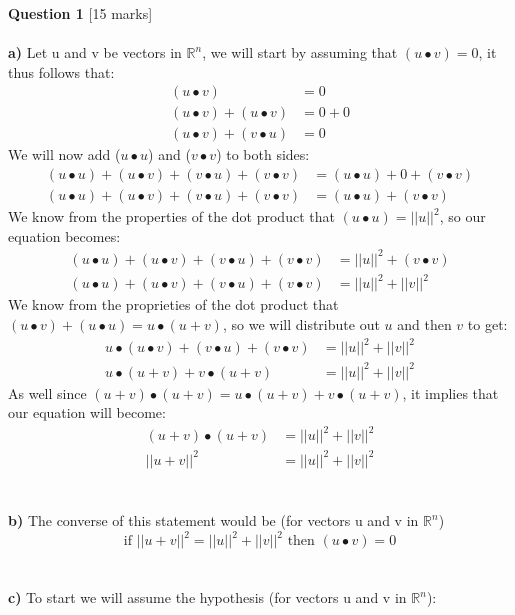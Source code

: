 \documentclass[11pt]{article}
\begin{document}
\textbf{Question 1} [15 marks] \\\\
\textbf{a)} Let u and v be vectors in $\mathbb{R}^n$, we will start by assuming that $(u \bullet v) = 0$, it thus follows that:
\begin{align*}
(u \bullet v)  &= 0 \\
(u \bullet v)  + (u \bullet v) &= 0 + 0\\
(u \bullet v) + (v \bullet u) &= 0
\end{align*}
We will now add ($u \bullet u$) and ($v \bullet v$) to both sides:
\begin{align*}
(u \bullet u) + (u \bullet v)  + (v \bullet u) + (v \bullet v)  &=(u \bullet u) + 0 + (v \bullet v)\\
(u \bullet u) + (u \bullet v)  + (v \bullet u) + (v \bullet v)  &=(u \bullet u) + (v \bullet v)
\end{align*}
We know from the properties of the dot product that $(u\bullet u) = ||u||^2$, so our equation becomes:
\begin{align*}
(u \bullet u) + (u \bullet v)  + (v \bullet u) + (v \bullet v)  &=||u||^2 + (v \bullet v)\\
(u \bullet u) + (u \bullet v)  + (v \bullet u) + (v \bullet v)  &=||u||^2 + ||v||^2
\end{align*}
We know from the proprieties of the dot product that $(u \bullet v) + (u \bullet u) = u \bullet (u+ v)$, so we will distribute out $u$ and then $v$ to get:
\begin{align*}
u \bullet (u \bullet v)  + (v \bullet u) + (v \bullet v)  &=||u||^2 + ||v||^2\\
u \bullet (u + v) +  v \bullet (u + v) &=||u||^2 + ||v||^2
\end{align*}
As well since $(u + v) \bullet (u + v)  = u \bullet (u + v) +  v \bullet (u + v)$, it implies that our equation will become:
\begin{align*}
(u + v) \bullet (u + v) &=||u||^2 + ||v||^2 \\
||u + v||^2 &=||u||^2 + ||v||^2
\end{align*}\\\\
\textbf{b)} The converse of this statement would be (for vectors u and v in $\mathbb{R}^n$)
\[ \text{if } ||u + v||^2 = ||u||^2 + ||v||^2 \text{ then } (u \bullet v) = 0 \]\\\\
\textbf{c)} To start we will assume the hypothesis (for vectors u and v in $\mathbb{R}^n$):
\end{document}
